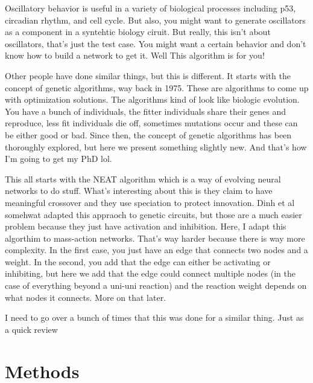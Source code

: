 \documentclass[12pt]{report}
\begin{document}
Oscillatory behavior is useful in a variety of biological processes including p53, circadian rhythm, and cell cycle. But also, you might want to generate oscillators as a component in a syntehtic biology ciruit. But really, this isn't about oscillators, that's just the test case. You might want a certain behavior and don't know how to build a  network to get it. Well This algorithm is for you! 

Other people have done similar things, but this is different. It starts with the concept of genetic algorithms, way back in 1975. These are algorithms to come up with optimization solutions. The algorithms kind of look like biologic evolution. You have a bunch of individuals, the fitter individuals share their genes and reproduce, less fit individuals die off, sometimes mutations occur and these can be either good or bad. Since then, the concept of genetic algorithms has been thoroughly explored, but here we present something slightly new. And that's how I'm going to get my PhD lol.

This all starts with the NEAT algorithm which is a way of evolving neural networks to do stuff.  What's interesting about this is they claim to have meaningful crossover and they use speciation to protect innovation. Dinh et al somehwat adapted this appraoch to genetic circuits, but those are a much easier problem because they just have activation and inhibition. Here, I adapt this algorthim to mass-action networks. That's way harder because there is way more complexity. In the first case, you just have an edge that connects two nodes and a weight. In the second, you add that the edge can either be activating or inhibiting, but here we add that the edge could connect multiple nodes (in the case of everything beyond a uni-uni reaction) and the reaction weight depends on what nodes it connects. More on that later.

I need to go over a bunch of times that this was done for a similar thing. Just as a quick review




\section{Methods}
\end{document}
